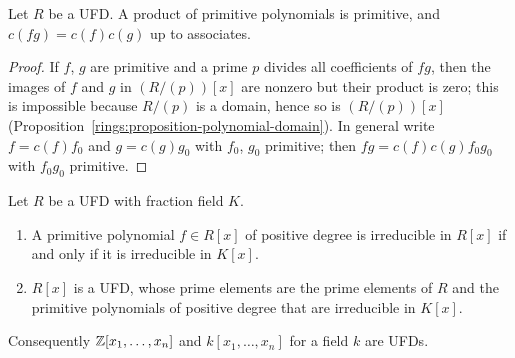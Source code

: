 \begin{lemma}[Gauss]\label{rings:lemma-gauss}
Let $R$ be a UFD. A product of primitive polynomials is primitive, and
$c(fg) = c(f)c(g)$ up to associates.
\end{lemma}

\begin{proof}
If $f$, $g$ are primitive and a prime $p$ divides all coefficients of $fg$, then the images
of $f$ and $g$ in $(R/(p))[x]$ are nonzero but their product is zero; this is impossible
because $R/(p)$ is a domain, hence so is $(R/(p))[x]$
(Proposition~\ref{rings:proposition-polynomial-domain}). In general write $f = c(f)f_0$ and
$g = c(g)g_0$ with $f_0$, $g_0$ primitive; then $fg = c(f)c(g) f_0 g_0$ with $f_0g_0$
primitive.
\end{proof}

\begin{theorem}\label{rings:theorem-polynomial-ufd}
Let $R$ be a UFD with fraction field $K$.
\begin{enumerate}
\item A primitive polynomial $f \in R[x]$ of positive degree is irreducible in $R[x]$ if
and only if it is irreducible in $K[x]$.
\item $R[x]$ is a UFD, whose prime elements are the prime elements of $R$ and the
primitive polynomials of positive degree that are irreducible in $K[x]$.
\end{enumerate}
Consequently $\mathbb{Z}[x_1, \ldots, x_n]$ and $k[x_1, \ldots, x_n]$ for a field $k$ are UFDs.
\end{theorem}

